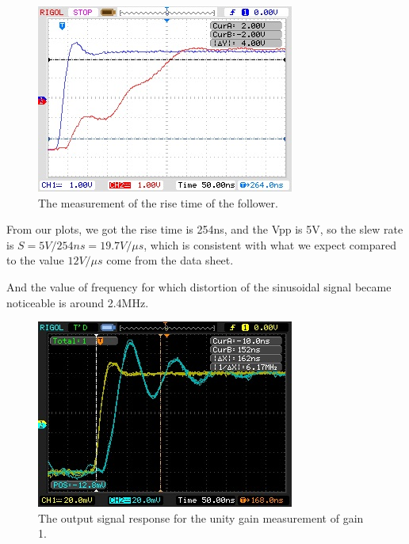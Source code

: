 \documentclass[11pt]{article}
\begin{document}
\begin{figure}[H]
 \begin{center}
  \includegraphics[width=\linewidth/1]{act1raising}
  \caption{The measurement of the rise time of the follower.}
  \label{fig:act1raising}
 \end{center}
\end{figure}

From our plots, we got the rise time is 254ns, and the Vpp is 5V, so the slew rate is $S=5V/254ns=19.7V/\mu s$, which is consistent with what we expect compared to the value $12V/\mu s$ come from the data sheet.

And the value of frequency for which distortion of the sinusoidal signal became noticeable is around 2.4MHz.

\begin{figure}[H]
 \begin{center}
  \includegraphics[width=\linewidth/2]{act1Gain1}
  \caption{The output signal response for the unity gain measurement of gain 1.}
  \label{fig:act1Gain1}
 \end{center}
\end{figure}
\end{document}
